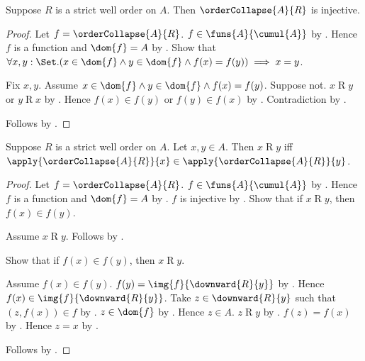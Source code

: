 \begin{proposition}\label{order_collapse_injective}
    Suppose $R$ is a strict well order on $A$.
    Then $\orderCollapse{A}{R}$ is injective.
\end{proposition}
\begin{proof}
    Let $f=\orderCollapse{A}{R}$.
    $f\in\funs{A}{\cumul{A}}$ by .
    Hence $f$ is a function and $\dom{f}=A$
        by .
    Show that
        $\forall x,y:\Set.
            (x\in\dom{f}\land y\in\dom{f}\land f(x)=f(y))
            \implies x=y$.
    \begin{subproof}
        Fix $x,y$.
        Assume $x\in\dom{f}\land y\in\dom{f}\land f(x)=f(y)$.
        Suppose not.
        $x\mathrel{R}y$ or $y\mathrel{R}x$
            by
            .
        Hence $f(x)\in f(y)$ or $f(y)\in f(x)$
            by .
        Contradiction by .
    \end{subproof}
    Follows by .
\end{proof}

\begin{proposition}\label{order_collapse_relation_iff}
    Suppose $R$ is a strict well order on $A$.
    Let $x,y\in A$.
    Then
        $x\mathrel{R}y$ iff
        $\apply{\orderCollapse{A}{R}}{x}
            \in\apply{\orderCollapse{A}{R}}{y}$.
\end{proposition}
\begin{proof}
    Let $f=\orderCollapse{A}{R}$.
    $f\in\funs{A}{\cumul{A}}$ by .
    Hence $f$ is a function and $\dom{f}=A$
        by .
    $f$ is injective by .
    Show that if $x\mathrel{R}y$, then $f(x)\in f(y)$.
    \begin{subproof}
        Assume $x\mathrel{R}y$.
        Follows by .
    \end{subproof}
    Show that if $f(x)\in f(y)$, then $x\mathrel{R}y$.
    \begin{subproof}
        Assume $f(x)\in f(y)$.
        $f(y)=\img{f}{\downward{R}{y}}$
            by .
        Hence $f(x)\in\img{f}{\downward{R}{y}}$.
        Take $z\in\downward{R}{y}$ such that $(z,f(x))\in f$
            by .
        $z\in\dom{f}$ by .
        Hence $z\in A$.
        $z\mathrel{R}y$ by .
        $f(z)=f(x)$ by .
        Hence $z=x$ by .
    \end{subproof}
    Follows by \auto.
\end{proof}

